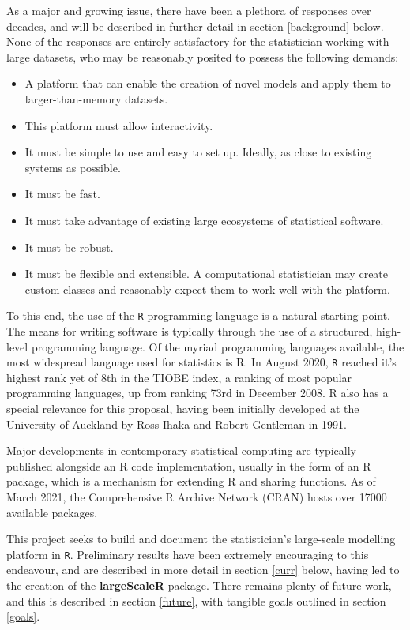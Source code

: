 As a major and growing issue, there have been a plethora of responses over decades, and will be described in further detail in section \ref{background} below.
None of the responses are entirely satisfactory for the statistician working with large datasets, who may be reasonably posited to possess the following demands:

\begin{itemize}
        \item A platform that can enable the creation of novel models and apply them to larger-than-memory datasets.
        \item This platform must allow interactivity.
        \item It must be simple to use and easy to set up.
                Ideally, as close to existing systems as possible.
        \item It must be fast.
        \item It must take advantage of existing large ecosystems of statistical software.
        \item It must be robust.
        \item It must be flexible and extensible.
                A computational statistician may create custom classes and reasonably expect them to work well with the platform.
\end{itemize}

To this end, the use of the \texttt{R} programming language is a natural starting point.
The means for writing software is typically through the use of a structured, high-level programming language.
Of the myriad programming languages available, the most widespread language used for statistics is R.
In August 2020, \texttt{R} reached it's highest rank yet of 8th in the TIOBE index, a ranking of most popular programming languages, up from ranking 73rd in December 2008\cite{tiobe2021r}.
R also has a special relevance for this proposal, having been initially developed at the University of Auckland by Ross Ihaka and Robert Gentleman in 1991\cite{ihaka1996r}.

Major developments in contemporary statistical computing are typically published alongside an R code implementation, usually in the form of an R package, which is a mechanism for extending R and sharing functions.
As of March 2021, the Comprehensive R Archive Network (CRAN) hosts over 17000 available packages\cite{team20:_r}.

This project seeks to build and document the statistician's large-scale modelling platform in \texttt{R}.
Preliminary results have been extremely encouraging to this endeavour, and are described in more detail in section \ref{curr} below, having led to the creation of the \textbf{largeScaleR} package.
There remains plenty of future work, and this is described in section \ref{future}, with tangible goals outlined in section \ref{goals}.

